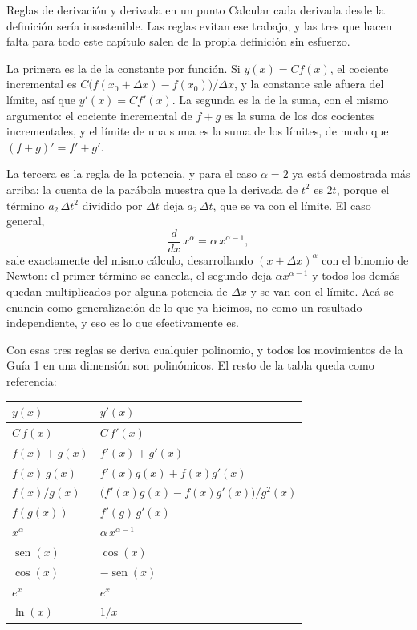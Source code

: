 \documentclass[11pt,openany]{book}
\newcommand{\sen}{\operatorname{sen}}
\begin{document}
\begin{bloque}{Reglas de derivación y derivada en un punto}
Calcular cada derivada desde la definición sería insostenible. Las reglas evitan ese trabajo, y las tres que hacen falta para todo este capítulo salen de la propia definición sin esfuerzo.

La primera es la de la constante por función. Si $y(x) = C f(x)$, el cociente incremental es $C\big(f(x_0+\Delta x)-f(x_0)\big)/\Delta x$, y la constante sale afuera del límite, así que $y'(x) = C f'(x)$. La segunda es la de la suma, con el mismo argumento: el cociente incremental de $f+g$ es la suma de los dos cocientes incrementales, y el límite de una suma es la suma de los límites, de modo que $(f+g)' = f' + g'$.

La tercera es la regla de la potencia, y para el caso $\alpha = 2$ ya está demostrada más arriba: la cuenta de la parábola muestra que la derivada de $t^2$ es $2t$, porque el término $a_2\,\Delta t^2$ dividido por $\Delta t$ deja $a_2\,\Delta t$, que se va con el límite. El caso general,
\[
\frac{d}{dx}\,x^{\alpha} = \alpha\,x^{\alpha-1},
\]
sale exactamente del mismo cálculo, desarrollando $(x+\Delta x)^\alpha$ con el binomio de Newton: el primer término se cancela, el segundo deja $\alpha x^{\alpha-1}$ y todos los demás quedan multiplicados por alguna potencia de $\Delta x$ y se van con el límite. Acá se enuncia como generalización de lo que ya hicimos, no como un resultado independiente, y eso es lo que efectivamente es.

Con esas tres reglas se deriva cualquier polinomio, y todos los movimientos de la Guía 1 en una dimensión son polinómicos. El resto de la tabla queda como referencia:

\begin{center}
\begin{tabular}{ll}
\toprule
$y(x)$ & $y'(x)$ \\
\midrule
$C\,f(x)$ & $C\,f'(x)$ \\
$f(x)+g(x)$ & $f'(x)+g'(x)$ \\
$f(x)\,g(x)$ & $f'(x)g(x)+f(x)g'(x)$ \\
$f(x)/g(x)$ & $\big(f'(x)g(x)-f(x)g'(x)\big)\big/g^2(x)$ \\
$f(g(x))$ & $f'(g)\,g'(x)$ \\
$x^{\alpha}$ & $\alpha\,x^{\alpha-1}$ \\
$\sen(x)$ & $\cos(x)$ \\
$\cos(x)$ & $-\sen(x)$ \\
$e^{x}$ & $e^{x}$ \\
$\ln(x)$ & $1/x$ \\
\bottomrule
\end{tabular}
\end{center}


\end{bloque}
\end{document}
